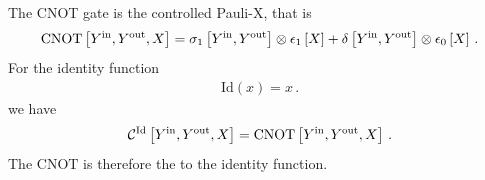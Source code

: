 \begin{example}\label{exa:cnotBenc}
    The CNOT gate is the controlled Pauli-X, that is
    \begin{align*}
        \mathrm{CNOT}\left[Y^{\mathrm{in}},Y^{\mathrm{out}},X\right]
        = \sigma_1\left[Y^{\mathrm{in}},Y^{\mathrm{out}}\right] \otimes \epsilon_{1}\left[X\right]
        + \delta\left[Y^{\mathrm{in}},Y^{\mathrm{out}}\right] \otimes \epsilon_{0}\left[X\right] \, .
    \end{align*}
    For the identity function
    \begin{align*}
        \mathrm{Id}(x) = x \, .
    \end{align*}
    we have
    \begin{align*}
        \mathcal{C}^{\mathrm{Id}}\left[Y^{\mathrm{in}},Y^{\mathrm{out}},X\right]
        = \mathrm{CNOT}\left[Y^{\mathrm{in}},Y^{\mathrm{out}},X\right] \, .
    \end{align*}
    The $\mathrm{CNOT}$ is therefore the \computationCircuit{} to the identity function.
\end{example}